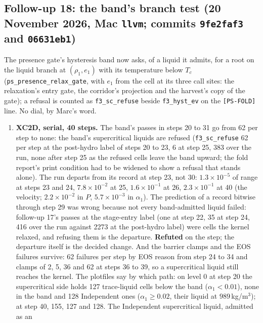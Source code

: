 \documentclass[11pt,a4paper]{article}
\newcommand{\code}[1]{\texttt{\small #1}}
\begin{document}
\subsection{Follow-up 18: the band's branch test (20 November 2026, Mac \code{llvm}; commits \code{9fe2faf3} and \code{06631eb1})}

The presence gate's hysteresis band now asks, of a liquid it admits,
for a root on the liquid branch at $(\rho_1, e_1)$ with its temperature
below $T_c$ (\code{ps\_presence\_relax\_gate}, with $e_1$ from the cell
at its three call sites: the relaxation's entry gate, the corridor's
projection and the harvest's copy of the gate); a refusal is counted as
\code{f3\_sc\_refuse} beside \code{f3\_hyst\_ev} on the \code{[PS-FOLD]}
line.  No dial, by Marc's word.
\begin{enumerate}[nosep]
\item \textbf{XC2D, serial, 40 steps.}  The band's passes in steps 20
      to 31 go from 62 per step to none: the band's supercritical
      liquids are refused (\code{f3\_sc\_refuse} 62 per step at the post-hydro label of steps 20 to 23, 6 at step 25, 383 over the run, none after step 25 as the refused cells leave the band upward; the fold report's print condition had to be widened to show a refusal that stands alone).  The run departs from its
      record at step 23, not 30: $1.3\times10^{-5}$ of range at steps 23
      and 24, $7.8\times10^{-2}$ at 25, $1.6\times10^{-1}$ at 26,
      $2.3\times10^{-1}$ at 40 (the velocity; $2.2\times10^{-2}$ in $P$,
      $5.7\times10^{-3}$ in $\alpha_1$).  The prediction of a record
      bitwise through step 29 was wrong because not every band-admitted
      liquid failed: follow-up 17's passes at the stage-entry label (one
      at step 22, 35 at step 24, 416 over the run against 2273 at the
      post-hydro label) were cells the kernel relaxed, and refusing them
      is the departure.  \textbf{Refuted} on the step; the departure
      itself is the decided change.  And the barrier clamps and the EOS
      failures survive: 62 failures per step by EOS reason from step 24
      to 34 and clamps of 2, 5, 36 and 62 at steps 36 to 39, so a
      supercritical liquid still reaches the kernel.  The plotfiles say
      by which path: on level 0 at step 20 the supercritical side holds
      127 trace-liquid cells below the band ($\alpha_1 < 0.01$), none in
      the band and 128 Independent ones ($\alpha_1 \ge 0.02$, their
      liquid at $989$\,kg/m$^3$); at step 40, 155, 127 and 128.  The
      Independent supercritical liquid, admitted as an

\end{enumerate}
\end{document}
